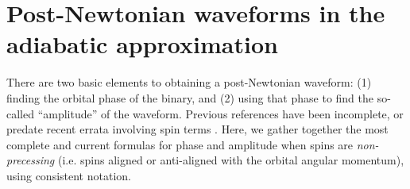 \newcommand{\xhat}{\vec{e}_x}
\newcommand{\yhat}{\vec{e}_y}
\newcommand{\zhat}{\vec{e}_z}
\newcommand{\ihat}{\vec{e}_i}
\newcommand{\jhat}{\vec{e}_j}
\newcommand{\rhat}{\vec{e}_{r}}
\newcommand{\iotahat}{\vec{e}_{\iota}}
\newcommand{\phihat}{\vec{e}_{\phi}}
\newcommand{\eplus}{\tens{e}_+}
\newcommand{\ecross}{\tens{e}_\times}
\newcommand{\Sl}{S_\ell}
\newcommand{\Sigmal}{\Sigma_\ell}
\newcommand{\Flux}{\mathcal{F}}

\section{Post-Newtonian waveforms in the adiabatic approximation}
\renewcommand{\theequation}{A.\arabic{equation}}

There are two basic elements to obtaining a post-Newtonian waveform:
(1) finding the orbital phase of the binary, and (2) using that phase
to find the so-called ``amplitude'' of the waveform.  Previous
references have been incomplete, or predate recent errata involving
spin terms \cite{Blanchet:2006gy,Arun:2009}.  Here, we gather together the most complete and current
formulas for phase and amplitude when spins are \emph{non-precessing}
 (i.e. spins aligned or anti-aligned with the
  orbital angular momentum), using consistent
notation.

